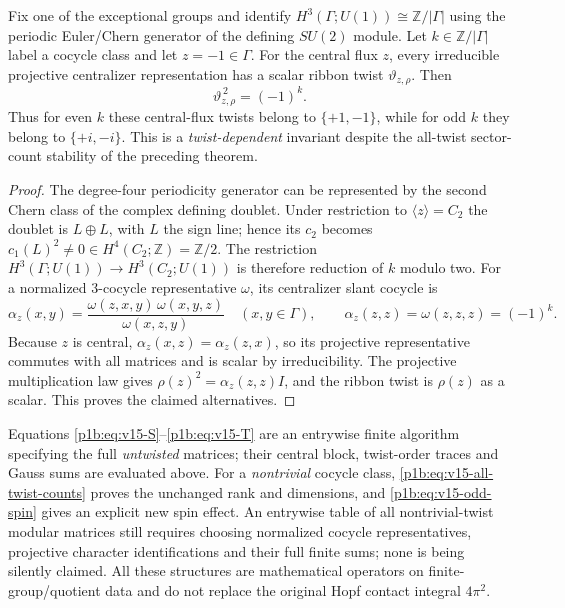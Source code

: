 \documentclass[11pt]{article}
\begin{document}
\begin{proposition}
\label{p1b:prop:v15-odd-central-flux}
Fix one of the exceptional groups and identify
$H^3(\Gamma;U(1))\cong\mathbb Z/|\Gamma|$ using the periodic
Euler/Chern generator of the defining $SU(2)$ module.
Let $k\in\mathbb Z/|\Gamma|$ label a cocycle class and let
$z=-1\in\Gamma$. For the central flux $z$, every irreducible
projective centralizer representation has a scalar ribbon twist
$\vartheta_{z,\rho}$. Then
\[
\boxed{\vartheta_{z,\rho}^{\,2}=(-1)^k.}
\tag{T15.13}\label{p1b:eq:v15-odd-spin}
\]
Thus for even $k$ these central-flux twists belong to
$\{+1,-1\}$, while for odd $k$ they belong to $\{+i,-i\}$.
This is a \emph{twist-dependent} invariant despite the all-twist
sector-count stability of the preceding theorem.
\end{proposition}
\begin{proof}
The degree-four periodicity generator can be represented by the
second Chern class of the complex defining doublet. Under
restriction to $\langle z\rangle=C_2$ the doublet is
$L\oplus L$, with $L$ the sign line; hence its $c_2$ becomes
$c_1(L)^2\ne0\in H^4(C_2;\mathbb Z)=\mathbb Z/2$.
The restriction $H^3(\Gamma;U(1))\to H^3(C_2;U(1))$
is therefore reduction of $k$ modulo two.
For a normalized $3$-cocycle representative $\omega$,
its centralizer slant cocycle is
\[
 \alpha_z(x,y)=
 \frac{\omega(z,x,y)\,\omega(x,y,z)}{\omega(x,z,y)}
 \quad(x,y\in\Gamma),
\qquad \alpha_z(z,z)=\omega(z,z,z)=(-1)^k.
\]
Because $z$ is central, $\alpha_z(x,z)=\alpha_z(z,x)$,
so its projective representative commutes with all matrices and is
scalar by irreducibility.  The projective multiplication law gives
$\rho(z)^2=\alpha_z(z,z)I$, and the ribbon twist is
$\rho(z)$ as a scalar. This proves the claimed alternatives.
\end{proof}

\begin{remark}
\label{p1b:rem:v15-completeness}
Equations \eqref{p1b:eq:v15-S}--\eqref{p1b:eq:v15-T}
are an entrywise finite algorithm specifying the full \emph{untwisted}
matrices; their central block, twist-order traces and Gauss sums are
evaluated above. For a \emph{nontrivial} cocycle class,
\eqref{p1b:eq:v15-all-twist-counts} proves the unchanged rank and
dimensions, and \eqref{p1b:eq:v15-odd-spin} gives an explicit new
spin effect. An entrywise table of all nontrivial-twist modular
matrices still requires choosing normalized cocycle representatives,
projective character identifications and their full finite sums;
none is being silently claimed.  All these structures are mathematical
operators on finite-group/quotient data and do not replace the
original Hopf contact integral $4\pi^2$.
\end{remark}
\end{document}
